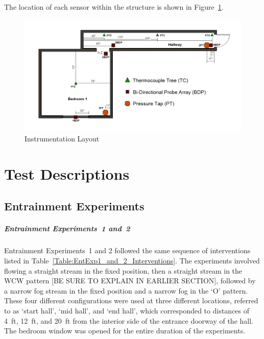 \documentclass[12pt,oneside]{book}
\begin{document}
The location of each sensor within the structure is shown in Figure~\ref{fig:InstrumentDim}.

\begin{figure}[H]
	\centering
	\includegraphics[width=\textwidth]{Figures/Instrumentation/Instrument_Dimensions.png}
	\caption{Instrumentation Layout}
	\label{fig:InstrumentDim}
\end{figure}

\clearpage

\chapter{Test Descriptions}

\section*{Entrainment Experiments}

\paragraph{Entrainment Experiments~1 and~2} \mbox{}
Entrainment Experiments~1 and 2 followed the same sequence of interventions listed in Table~\ref{Table:EntExp1_and_2_Interventions}. The experiments involved flowing a straight stream in the fixed position, then a straight stream in the WCW pattern [BE SURE TO EXPLAIN IN EARLIER SECTION], followed by a narrow fog stream in the fixed position and a narrow fog in the `O' pattern. These four different configurations were used at three different locations, referred to as `start hall', `mid hall', and `end hall', which corresponded to distances of 4~ft, 12~ft, and 20~ft from the interior side of the entrance doorway of the hall. The bedroom window was opened for the entire duration of the experiments.

\end{document}
